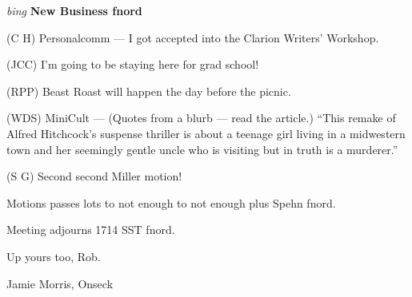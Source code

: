 \vspace{0.15in}
{\em bing\/} {\bf New Business fnord\/}

(C H) Personalcomm --- I got accepted into the Clarion Writers' Workshop.

(JCC) I'm going to be staying here for grad school!

(RPP) Beast Roast will happen the day before the picnic.

(WDS) MiniCult --- (Quotes from a blurb --- read the article.)  ``This remake
of Alfred Hitchcock's suspense thriller is about a teenage girl living in a
midwestern town and her seemingly gentle uncle who is visiting but in truth is
a murderer.''

(S G) Second second Miller motion!

Motions passes lots to not enough to not enough plus Spehn fnord.

Meeting adjourns 1714 SST fnord.

\vspace{0.15in}
\begin{center}
Up yours too, Rob.

Jamie Morris, Onseck
\end{center}

